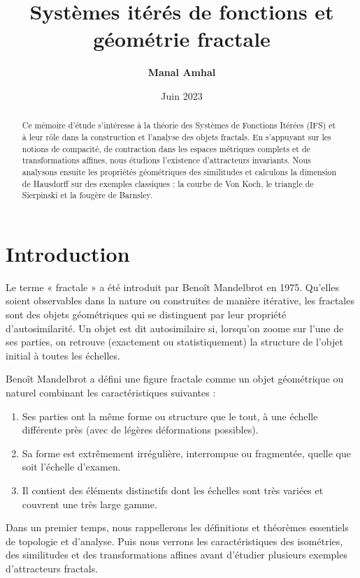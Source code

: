 \documentclass[11pt,a4paper]{article}
\title{\textbf{Systèmes itérés de fonctions et géométrie fractale}}
\author{\textbf{Manal Amhal}}
\date{Juin 2023}
\begin{document}
\maketitle

\begin{abstract}
\noindent Ce mémoire d'étude s'intéresse à la théorie des Systèmes de Fonctions Itérées (IFS) et à leur rôle dans la construction et l'analyse des objets fractals. En s'appuyant sur les notions de compacité, de contraction dans les espaces métriques complets et de transformations affines, nous étudions l'existence d'attracteurs invariants. Nous analysons ensuite les propriétés géométriques des similitudes et calculons la dimension de Hausdorff sur des exemples classiques : la courbe de Von Koch, le triangle de Sierpinski et la fougère de Barnsley.
\end{abstract}

\vspace{0.3cm}



\section{Introduction}
Le terme « fractale » a été introduit par Benoît Mandelbrot en 1975. Qu'elles soient observables dans la nature ou construites de manière itérative, les fractales sont des objets géométriques qui se distinguent par leur propriété d'autosimilarité. Un objet est dit autosimilaire si, lorsqu'on zoome sur l'une de ses parties, on retrouve (exactement ou statistiquement) la structure de l'objet initial à toutes les échelles.

Benoît Mandelbrot a défini une figure fractale comme un objet géométrique ou naturel combinant les caractéristiques suivantes :
\begin{enumerate}
    \item Ses parties ont la même forme ou structure que le tout, à une échelle différente près (avec de légères déformations possibles).
    \item Sa forme est extrêmement irrégulière, interrompue ou fragmentée, quelle que soit l'échelle d'examen.
    \item Il contient des éléments distinctifs dont les échelles sont très variées et couvrent une très large gamme.
\end{enumerate}

Dans un premier temps, nous rappellerons les définitions et théorèmes essentiels de topologie et d'analyse. Puis nous verrons les caractéristiques des isométries, des similitudes et des transformations affines avant d'étudier plusieurs exemples d'attracteurs fractals.
\end{document}
